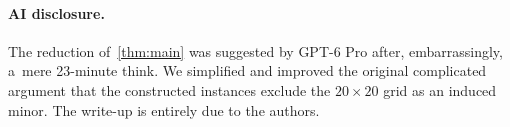 \documentclass[a4paper,UKenglish,cleveref,autoref]{lipics-v2021}
\begin{document}
\paragraph*{AI disclosure.}
The reduction of~\cref{thm:main} was suggested by GPT-6 Pro after, embarrassingly, a~mere 23-minute think.
We simplified and improved the original complicated argument that the constructed instances exclude the $20 \times 20$ grid as an induced minor.
The write-up is entirely due to the authors.


\end{document}
